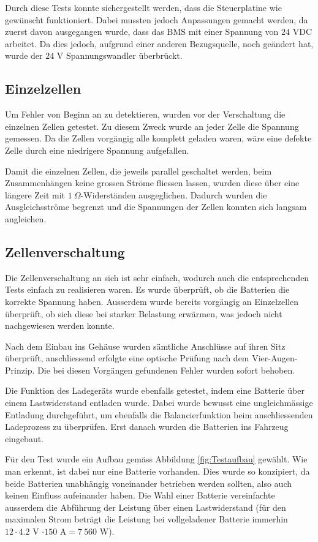 Durch diese Tests konnte sichergestellt werden, dass die Steuerplatine wie gewünscht funktioniert. Dabei mussten jedoch Anpassungen gemacht werden, da zuerst davon ausgegangen wurde, dass das BMS mit einer Spannung von $24$ VDC arbeitet. Da dies jedoch, aufgrund einer anderen Bezugsquelle, noch geändert hat, wurde der $24$ V Spannungswandler überbrückt.

\subsection{Einzelzellen}
Um Fehler von Beginn an zu detektieren, wurden vor der Verschaltung die einzelnen Zellen getestet. Zu diesem Zweck wurde an jeder Zelle die Spannung gemessen. Da die Zellen vorgängig alle komplett geladen waren, wäre eine defekte Zelle durch eine niedrigere Spannung aufgefallen.

Damit die einzelnen Zellen, die jeweils parallel geschaltet werden, beim Zusammenhängen keine grossen Ströme fliessen lassen, wurden diese über eine längere Zeit mit $1\ \Omega$-Widerständen ausgeglichen. Dadurch wurden die Ausgleichsströme begrenzt und die Spannungen der Zellen konnten sich langsam angleichen.

\subsection{Zellenverschaltung}
Die Zellenverschaltung an sich ist sehr einfach, wodurch auch die entsprechenden Tests einfach zu realisieren waren. Es wurde überprüft, ob die Batterien die korrekte Spannung haben. Ausserdem wurde bereits vorgängig an Einzelzellen überprüft, ob sich diese bei starker Belastung erwärmen, was jedoch nicht nachgewiesen werden konnte.

Nach dem Einbau ins Gehäuse wurden sämtliche Anschlüsse auf ihren Sitz überprüft, anschliessend erfolgte eine optische Prüfung nach dem Vier-Augen-Prinzip. Die bei diesen Vorgängen gefundenen Fehler wurden sofort behoben.

Die Funktion des Ladegeräts wurde ebenfalls getestet, indem eine Batterie über einem Lastwiderstand entladen wurde. Dabei wurde bewusst eine ungleichmässige Entladung durchgeführt, um ebenfalls die Balancierfunktion beim anschliessenden Ladeprozess zu überprüfen. Erst danach wurden die Batterien ins Fahrzeug eingebaut.

\color{blue}Für den Test wurde ein Aufbau gemäss Abbildung \ref{fig:Testaufbau} gewählt. Wie man erkennt, ist dabei nur eine Batterie vorhanden. Dies wurde so konzipiert, da beide Batterien unabhängig voneinander betrieben werden sollten, also auch keinen Einfluss aufeinander haben. Die Wahl einer Batterie vereinfachte ausserdem die Abführung der Leistung über einen Lastwiderstand (für den maximalen Strom beträgt die Leistung bei vollgeladener Batterie immerhin \linebreak$12\cdot4.2$ V $\cdot 150$ A$=7\ 560$ W).\newpage

